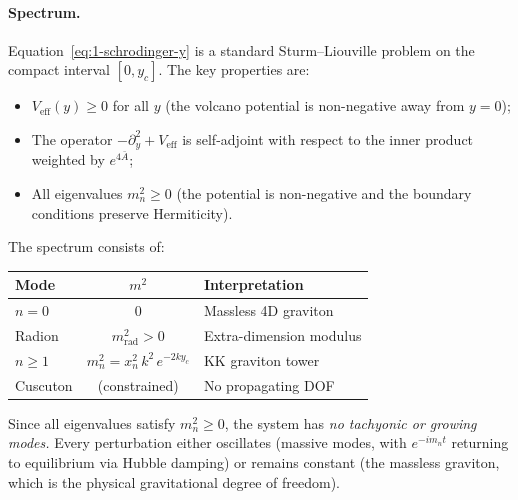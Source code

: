 \paragraph{Spectrum.} Equation~\eqref{eq:1-schrodinger-y} is a standard Sturm--Liouville problem on the compact interval $[0, y_c]$. The key properties are:
\begin{itemize}
\item $V_{\mathrm{eff}}(y) \geq 0$ for all $y$ (the volcano potential is non-negative away from $y = 0$);
\item The operator $-\partial_y^2 + V_{\mathrm{eff}}$ is self-adjoint with respect to the inner product weighted by $e^{4\bar{A}}$;
\item All eigenvalues $m_n^2 \geq 0$ (the potential is non-negative and the boundary conditions preserve Hermiticity).
\end{itemize}
The spectrum consists of:
\begin{center}
\small
\begin{tabular}{lcl}
\toprule
Mode & $m^2$ & Interpretation \\
\midrule
$n = 0$ & $0$ & Massless 4D graviton \\
Radion & $m_{\mathrm{rad}}^2 > 0$ & Extra-dimension modulus \\
$n \geq 1$ & $m_n^2 = x_n^2\, k^2\, e^{-2ky_c}$ & KK graviton tower \\
Cuscuton & (constrained) & No propagating DOF \\
\bottomrule
\end{tabular}
\end{center}
Since all eigenvalues satisfy $m_n^2 \geq 0$, the system has \emph{no tachyonic or growing modes.} Every perturbation either oscillates (massive modes, with $e^{-im_n t}$ returning to equilibrium via Hubble damping) or remains constant (the massless graviton, which is the physical gravitational degree of freedom).

